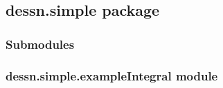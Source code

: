 \documentclass[letterpaper,10pt,english]{sphinxmanual}
\begin{document}
\subsection{dessn.simple package}
\label{dessn.simple::doc}\label{dessn.simple:dessn-simple-package}

\subsubsection{Submodules}
\label{dessn.simple:submodules}

\subsubsection{dessn.simple.exampleIntegral module}
\label{dessn.simple:dessn-simple-exampleintegral-module}\label{dessn.simple:module-dessn.simple.exampleIntegral}
\end{document}
